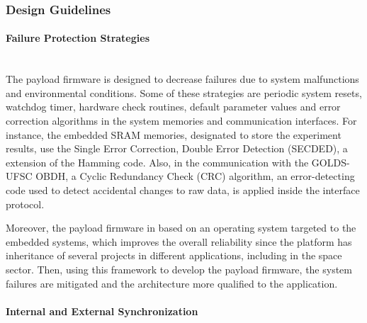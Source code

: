 
\subsubsection{Design Guidelines}

\paragraph{Failure Protection Strategies} \mbox{}\\

The payload firmware is designed to decrease failures due to system malfunctions and environmental conditions. Some of these strategies are periodic system resets, watchdog timer, hardware check routines, default parameter values and error correction algorithms in the system memories and communication interfaces. For instance, the embedded SRAM memories, designated to store the experiment results, use the Single Error Correction, Double Error Detection (SECDED), a extension of the Hamming code. Also, in the communication with the GOLDS-UFSC OBDH, a Cyclic Redundancy Check (CRC) algorithm, an error-detecting code used to detect accidental changes to raw data, is applied inside the interface protocol. 

Moreover, the payload firmware in based on an operating system targeted to the embedded systems, which improves the overall reliability since the platform has inheritance of several projects in different applications, including in the space sector. Then, using this framework to develop the payload firmware, the system failures are mitigated and the architecture more qualified to the application.


\paragraph{Internal and External Synchronization} \mbox{}\\

